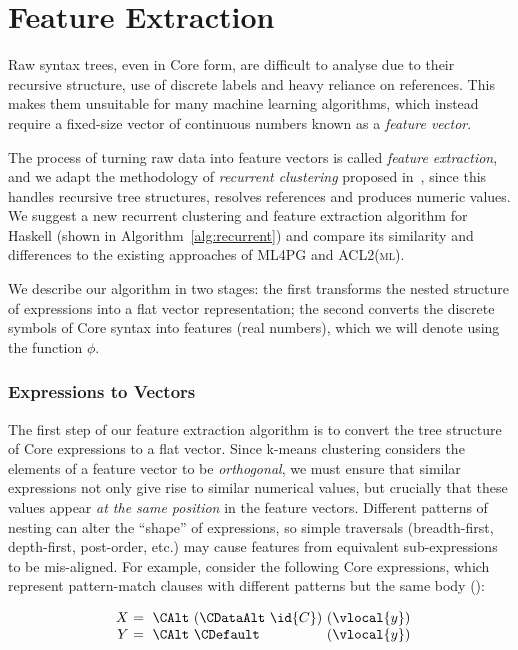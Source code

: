 \section{Feature Extraction}
\label{sec:featureextraction}

Raw syntax trees, even in Core form, are difficult to analyse due to their
recursive structure, use of discrete labels and heavy reliance on references.
This makes them unsuitable for many machine learning algorithms, which instead
require a fixed-size vector of continuous numbers known as a
\emph{feature vector}.

The process of turning raw data into feature vectors is called \emph{feature
  extraction}, and we adapt the methodology of \emph{recurrent clustering}
proposed in~\cite{DBLP:journals/corr/HerasK14,heras2013proof}, since this
handles recursive tree structures, resolves references and produces numeric
values. We suggest a new recurrent clustering and feature extraction algorithm
for Haskell (shown in Algorithm~\ref{alg:recurrent}) and compare its similarity
and differences to the existing approaches of \textsc{ML4PG} and
\textsc{ACL2(ml)}.

We describe our algorithm in two stages: the first transforms the nested
structure of expressions into a flat vector representation; the second converts
the discrete symbols of Core syntax into features (real numbers), which we will
denote using the function $\phi$.

\subsubsection{Expressions to Vectors}
\label{sec:expressionstovectors}

The first step of our feature extraction algorithm is to convert the tree
structure of Core expressions to a flat vector. Since k-means clustering
considers the elements of a feature vector to be \emph{orthogonal}, we must
ensure that similar expressions not only give rise to similar numerical values,
but crucially that these values appear \emph{at the same position} in the
feature vectors. Different patterns of nesting can alter the ``shape'' of
expressions, so simple traversals (breadth-first, depth-first, post-order, etc.)
may cause features from equivalent sub-expressions to be mis-aligned. For
example, consider the following Core expressions, which represent pattern-match
clauses with different patterns but the same body ():

\begin{equation*}\label{eq:xy}
  \begin{array}{r@{}l@{}l@{}}
    X\ &=\ \CAlt\ (\CDataAlt\ \id{C})\ & (\vlocal{y}) \\
    Y\ &=\ \CAlt\ \CDefault\           & (\vlocal{y})
  \end{array}
\end{equation*}

